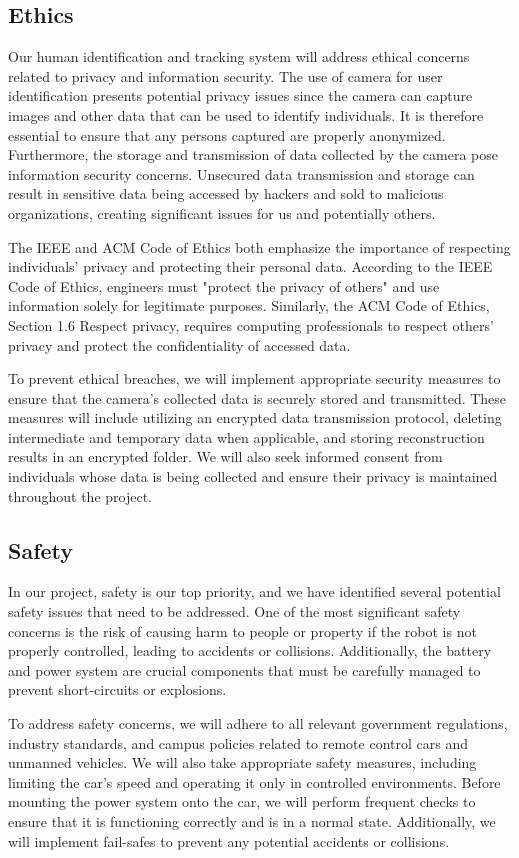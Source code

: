 \subsection{ Ethics }
Our human identification and tracking system will address ethical concerns related to privacy and information security. The use of camera for user identification presents potential privacy issues since the camera can capture images and other data that can be used to identify individuals. It is therefore essential to ensure that any persons captured are properly anonymized. Furthermore, the storage and transmission of data collected by the camera pose information security concerns. Unsecured data transmission and storage can result in sensitive data being accessed by hackers and sold to malicious organizations, creating significant issues for us and potentially others.

The IEEE and ACM Code of Ethics both emphasize the importance of respecting individuals' privacy and protecting their personal data. According to the IEEE Code of Ethics, engineers must "protect the privacy of others" and use information solely for legitimate purposes. Similarly, the ACM Code of Ethics, Section 1.6 Respect privacy, requires computing professionals to respect others' privacy and protect the confidentiality of accessed data.

To prevent ethical breaches, we will implement appropriate security measures to ensure that the camera's collected data is securely stored and transmitted. These measures will include utilizing an encrypted data transmission protocol, deleting intermediate and temporary data when applicable, and storing reconstruction results in an encrypted folder. We will also seek informed consent from individuals whose data is being collected and ensure their privacy is maintained throughout the project.
\subsection{ Safety }
In our project, safety is our top priority, and we have identified several potential safety issues that need to be addressed. One of the most significant safety concerns is the risk of causing harm to people or property if the robot is not properly controlled, leading to accidents or collisions. Additionally, the battery and power system are crucial components that must be carefully managed to prevent short-circuits or explosions.

To address safety concerns, we will adhere to all relevant government regulations, industry standards, and campus policies related to remote control cars and unmanned vehicles. We will also take appropriate safety measures, including limiting the car's speed and operating it only in controlled environments. Before mounting the power system onto the car, we will perform frequent checks to ensure that it is functioning correctly and is in a normal state. Additionally, we will implement fail-safes to prevent any potential accidents or collisions.